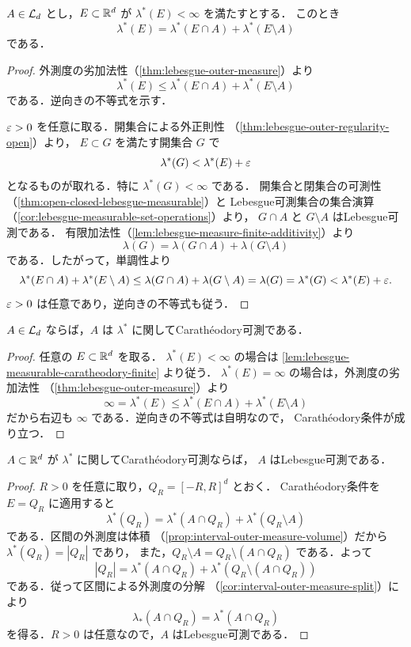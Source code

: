\begin{lemma}[有限外測度集合のCarathéodory分割]\label{lem:lebesgue-measurable-caratheodory-finite}
$A\in\mathcal L_d$ とし，$E\subset\mathbb R^d$ が $\lambda^*(E)<\infty$ を満たすとする．
このとき
\[
\lambda^*(E)
=
\lambda^*(E\cap A)+\lambda^*(E\setminus A)
\]
である．
\end{lemma}
\begin{proof}
外測度の劣加法性（\cref{thm:lebesgue-outer-measure}）より
\[
\lambda^*(E)
\le
\lambda^*(E\cap A)+\lambda^*(E\setminus A)
\]
である．逆向きの不等式を示す．

$\varepsilon>0$ を任意に取る．開集合による外正則性
（\cref{thm:lebesgue-outer-regularity-open}）より，
$E\subset G$ を満たす開集合 $G$ で
\[
\lambda^*(G)<\lambda^*(E)+\varepsilon
\]
となるものが取れる．特に $\lambda^*(G)<\infty$ である．
開集合と閉集合の可測性
（\cref{thm:open-closed-lebesgue-measurable}）と
Lebesgue可測集合の集合演算
（\cref{cor:lebesgue-measurable-set-operations}）より，
$G\cap A$ と $G\setminus A$ はLebesgue可測である．
有限加法性（\cref{lem:lebesgue-measure-finite-additivity}）より
\[
\lambda(G)=\lambda(G\cap A)+\lambda(G\setminus A)
\]
である．したがって，単調性より
\[
\lambda^*(E\cap A)+\lambda^*(E\setminus A)
\le
\lambda(G\cap A)+\lambda(G\setminus A)
=
\lambda(G)
=
\lambda^*(G)
<
\lambda^*(E)+\varepsilon.
\]
$\varepsilon>0$ は任意であり，逆向きの不等式も従う．
\end{proof}

\begin{theorem}[Lebesgue可測ならCarathéodory可測]\label{thm:lebesgue-measurable-implies-caratheodory}
$A\in\mathcal L_d$ ならば，$A$ は $\lambda^*$ に関してCarathéodory可測である．
\end{theorem}
\begin{proof}
任意の $E\subset\mathbb R^d$ を取る．
$\lambda^*(E)<\infty$ の場合は
\cref{lem:lebesgue-measurable-caratheodory-finite} より従う．
$\lambda^*(E)=\infty$ の場合は，外測度の劣加法性
（\cref{thm:lebesgue-outer-measure}）より
\[
\infty=\lambda^*(E)
\le
\lambda^*(E\cap A)+\lambda^*(E\setminus A)
\]
だから右辺も $\infty$ である．逆向きの不等式は自明なので，
Carathéodory条件が成り立つ．
\end{proof}

\begin{theorem}[Carathéodory可測ならLebesgue可測]\label{thm:caratheodory-implies-lebesgue-measurable}
$A\subset\mathbb R^d$ が $\lambda^*$ に関してCarathéodory可測ならば，
$A$ はLebesgue可測である．
\end{theorem}
\begin{proof}
$R>0$ を任意に取り，$Q_R=[-R,R]^d$ とおく．
Carathéodory条件を $E=Q_R$ に適用すると
\[
\lambda^*(Q_R)
=
\lambda^*(A\cap Q_R)+\lambda^*(Q_R\setminus A)
\]
である．区間の外測度は体積
（\cref{prop:interval-outer-measure-volume}）だから $\lambda^*(Q_R)=|Q_R|$ であり，
また，$Q_R\setminus A=Q_R\setminus(A\cap Q_R)$ である．よって
\[
|Q_R|
=
\lambda^*(A\cap Q_R)+\lambda^*(Q_R\setminus (A \cap Q_R))
\]
である．従って区間による外測度の分解
（\cref{cor:interval-outer-measure-split}）により
\[
\lambda_*(A\cap Q_R)=\lambda^*(A\cap Q_R)
\]
を得る．$R>0$ は任意なので，$A$ はLebesgue可測である．
\end{proof}

